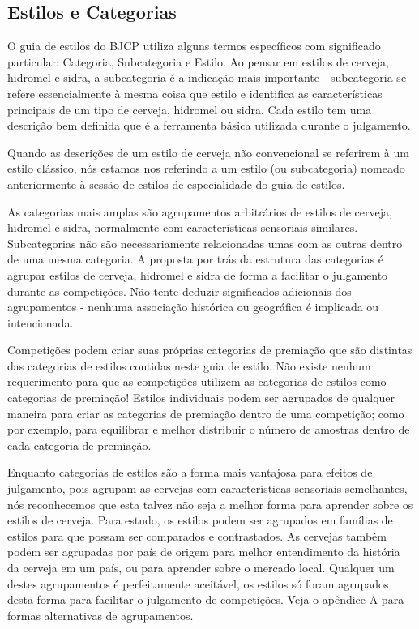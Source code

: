 \subsection*{Estilos e Categorias}
O guia de estilos do BJCP utiliza alguns termos específicos com significado particular: Categoria, Subcategoria e Estilo. Ao pensar em estilos de cerveja, hidromel e sidra, a subcategoria é a indicação mais importante - subcategoria se refere essencialmente à mesma coisa que estilo e identifica as características principais de um tipo de cerveja, hidromel ou sidra. Cada estilo tem uma descrição bem definida que é a ferramenta básica utilizada durante o julgamento.

Quando as descrições de um estilo de cerveja não convencional se referirem à um estilo clássico, nós estamos nos referindo a um estilo (ou subcategoria) nomeado anteriormente à sessão de estilos de especialidade do guia de estilos.

As categorias mais amplas são agrupamentos arbitrários de estilos de cerveja, hidromel e sidra, normalmente com características sensoriais similares. Subcategorias não são necessariamente relacionadas umas com as outras dentro de uma mesma categoria. A proposta por trás da estrutura das categorias é agrupar estilos de cerveja, hidromel e sidra de forma a facilitar o julgamento durante as competições. Não tente deduzir significados adicionais dos agrupamentos - nenhuma associação histórica ou geográfica é implicada ou intencionada.

Competições podem criar suas próprias categorias de premiação que são distintas das categorias de estilos contidas neste guia de estilo. Não existe nenhum requerimento para que as competições utilizem as categorias de estilos como categorias de premiação! Estilos individuais podem ser agrupados de qualquer maneira para criar as categorias de premiação dentro de uma competição; como por exemplo, para equilibrar e melhor distribuir o número de amostras dentro de cada categoria de premiação.

Enquanto categorias de estilos são a forma mais vantajosa para efeitos de julgamento, pois agrupam as cervejas com características sensoriais semelhantes, nós reconhecemos que esta talvez não seja a melhor forma para aprender sobre os estilos de cerveja. Para estudo, os estilos podem ser agrupados em famílias de estilos para que possam ser comparados e contrastados. As cervejas também podem ser agrupadas por país de origem para melhor entendimento da história da cerveja em um país, ou para aprender sobre o mercado local. Qualquer um destes agrupamentos é perfeitamente aceitável, os estilos só foram agrupados desta forma para facilitar o julgamento de competições. Veja o apêndice A para formas alternativas de agrupamentos.